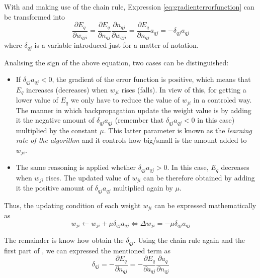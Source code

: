 With  and making use of the chain rule, Expression \ref{eq:gradienterrorfunction} can be transformed into
\begin{equation}
\frac{\partial E_{q}}{\partial w_{qji}}=
\frac{\partial E_{q}}{\partial n_{qj}}
\frac{\partial n_{qj}}{\partial w_{qji}}=
\frac{\partial E_{q}}{\partial n_{qj}} a_{qj}=
-\delta_{qj} a_{qj}
\label{eq:chainrulegradienterrorfunction}
\end{equation}
where $\delta_{qj}$ is a variable introduced just for a matter of notation.

Analising the sign of the above equation, two cases can be distinguished:
\begin{itemize}

\item If $\delta_{qj}a_{qj}<0$, the gradient of the error function is positive, which means that $E_{q}$ increases (decreases) when $w_{ji}$ rises (falls). In view of this, for getting a lower value of $E_{q}$ we only have to reduce the value of $w_{ji}$ in a controled way. The manner in which backpropagation update the weight value is by adding it the negative amount of $\delta_{qj}a_{qj}$ (remember that $\delta_{qj}a_{qj}<0$ in this case) multiplied by the constant $\mu$. This latter parameter is known as the \emph{learning rate of the algorithm} and it controls how big/small is the amount added to $w_{ji}$. 

\item The same reasoning is applied whether $\delta_{qj}a_{qj}>0$. In this case, $E_{q}$ decreases when $w_{ji}$ rises. The updated value of $w_{ji}$ can be therefore obtained by adding it the positive amount of $\delta_{qj}a_{qj}$ multiplied again by $\mu$.

\end{itemize}

Thus, the updating condition of each weight $w_{ji}$ can be expressed mathematically as
\begin{equation}
w_{ji}\leftarrow w_{ji}+ \mu\delta_{qj}a_{qj}
\Leftrightarrow 
\Delta w_{ji}= -\mu\delta_{qj}a_{qj}
\label{eq:updatingrule}
\end{equation}

The remainder is know how obtain the $\delta_{qj}$. Using the chain rule again and the first part of , we can expressed the mentioned term as
\begin{equation}
\delta_{qj}= 
- \frac{\partial E_{q}}{\partial n_{qj}}=
- \frac{\partial E_{q}}{\partial a_{qj}}
\frac{\partial a_{q}}{\partial n_{qj}}
\label{eq:factordelta}
\end{equation}

